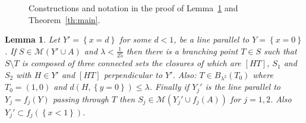 \documentclass{amsart}
\newcommand{\ENCLOSE}[1]{\left\{#1\right\}}
\newcommand{\M}{\mathcal{M}}
\newtheorem{lemma}[theorem]{Lemma}
\theoremstyle{definition}
\theoremstyle{remark}
\begin{document}
\begin{figure}
\begin{center}
    \caption{Constructions and notation in the proof of 
    Lemma~\ref{lm:branching} and Theorem~\ref{th:main}.}
  \end{center}
\end{figure}
\begin{lemma}\label{lm:branching}
  Let $Y'=\ENCLOSE{x=d}$ for some $d<1$,
  be a line parallel to $Y=\ENCLOSE{x=0}$.
  If $S\in \M(Y'\cup A)$
  and $\lambda < \frac 1 {25}$ then
  there is a branching point $T\in S$ 
  such that $S\setminus T$ is composed of 
  three connected sets the closures of which are
   $[HT]$, $S_1$ and $S_2$ 
  with $H\in Y'$ and $[HT]$ perpendicular to $Y'$.  
  Also: $T\in B_{\lambda^2}(T_0)$ where $T_0=(1,0)$
  and $d(H,\ENCLOSE{y=0})\le \lambda$.
  Finally if $Y_j'$ is the line parallel to $Y_j=f_j(Y)$ 
  passing through $T$ 
  then $S_j \in \M(Y_j'\cup f_j(A))$ for $j=1,2$.
  Also $Y_j'\subset f_j(\ENCLOSE{x<1})$.
\end{lemma}
\end{document}
